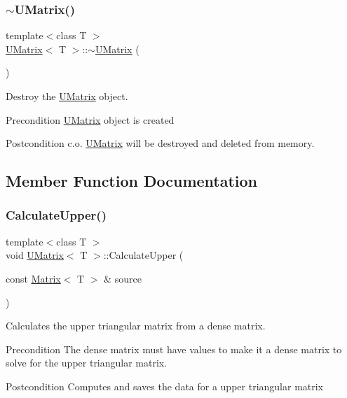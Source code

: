 \subsubsection{\texorpdfstring{$\sim$UMatrix()}{~UMatrix()}}
{\footnotesize\ttfamily template$<$class T $>$ \\
\mbox{\hyperlink{class_u_matrix}{U\+Matrix}}$<$ T $>$\+::$\sim$\mbox{\hyperlink{class_u_matrix}{U\+Matrix}} (\begin{DoxyParamCaption}{ }\end{DoxyParamCaption})}



Destroy the \mbox{\hyperlink{class_u_matrix}{U\+Matrix}} object. 

\begin{DoxyPrecond}{Precondition}
\mbox{\hyperlink{class_u_matrix}{U\+Matrix}} object is created 
\end{DoxyPrecond}
\begin{DoxyPostcond}{Postcondition}
c.\+o. \mbox{\hyperlink{class_u_matrix}{U\+Matrix}} will be destroyed and deleted from memory. 
\end{DoxyPostcond}


\subsection{Member Function Documentation}
\mbox{\label{class_u_matrix_a63af4ca40c18c71bd0609d4511779852}} 
\subsubsection{\texorpdfstring{CalculateUpper()}{CalculateUpper()}}
{\footnotesize\ttfamily template$<$class T $>$ \\
void \mbox{\hyperlink{class_u_matrix}{U\+Matrix}}$<$ T $>$\+::Calculate\+Upper (\begin{DoxyParamCaption}\item[{const \mbox{\hyperlink{class_matrix}{Matrix}}$<$ T $>$ \&}]{source }\end{DoxyParamCaption})}



Calculates the upper triangular matrix from a dense matrix. 

\begin{DoxyPrecond}{Precondition}
The dense matrix must have values to make it a dense matrix to solve for the upper triangular matrix. 
\end{DoxyPrecond}
\begin{DoxyPostcond}{Postcondition}
Computes and saves the data for a upper triangular matrix
\end{DoxyPostcond}

